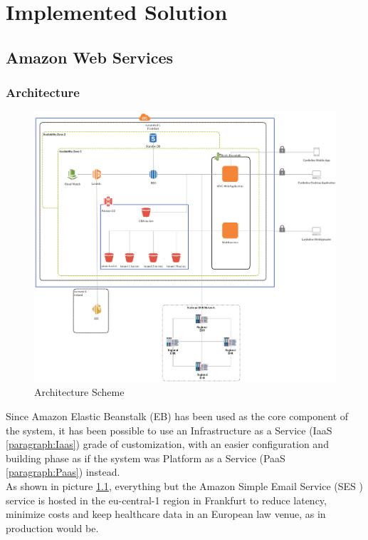 \chapter{Implemented Solution}

\section{Amazon Web Services}

\subsection{Architecture}
\begin{figure}[h]
    \includegraphics[width=\textwidth]{img/architecture}
    \caption{Architecture Scheme}
    \label{fig:architecture}
\end{figure}
Since Amazon Elastic Beanstalk (EB) has been used as the core component of the system, it has been possible to use an Infrastructure as a Service (IaaS \ref{paragraph:Iaas}) grade of customization, with an easier configuration and building phase as if the system was Platform as a Service (PaaS \ref{paragraph:Paas}) instead.\\
As shown in picture \ref{fig:architecture}, everything but the Amazon Simple Email Service (SES \cite{AmazonSes}) service is hosted in the eu-central-1 region in Frankfurt to reduce latency, minimize costs and keep healthcare data in an European law venue, as in production would be.
